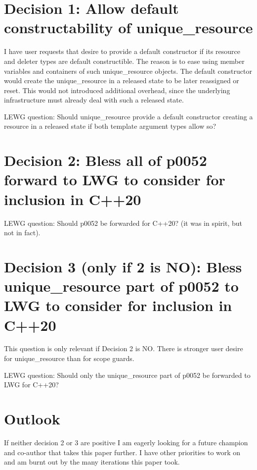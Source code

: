 \documentclass[ebook,11pt,article]{memoir}
\begin{document}
\section{Decision 1: Allow default constructability of unique_resource}
I have user requests that desire  to provide a default constructor if its resource and deleter types are default constructible. The reason is to ease using member variables and containers of such unique_resource objects. The default constructor would create the unique_resource in a released state to be later reassigned or reset. This would not introduced additional overhead, since the underlying infrastructure must already deal with such a released state.

LEWG question: Should unique_resource provide a default constructor creating a resource in a released state if both template argument types allow so?

\section{Decision 2: Bless all of p0052 forward to LWG to consider for inclusion in C++20}

LEWG question: Should p0052 be forwarded for C++20? (it was in spirit, but not in fact).

\section{Decision 3 (only if 2 is NO): Bless unique_resource part of p0052 to LWG to consider for inclusion in C++20}

This question is only relevant if Decision 2 is NO. There is stronger user desire for unique_resource than for scope guards.

LEWG question: Should only the unique_resource part of p0052 be forwarded to LWG for C++20?


\section{Outlook}
If neither decision 2 or 3 are positive I am eagerly looking for a future champion and co-author that takes this paper further. I have other priorities to work on and am burnt out by the many iterations this paper took.
\end{document}
